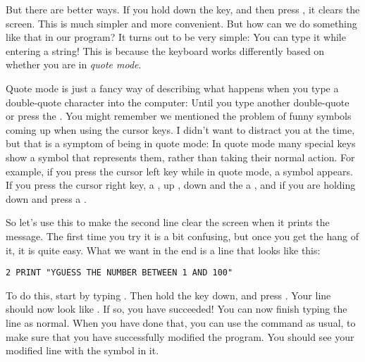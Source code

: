 But there are better ways.  If you hold down the 
key, and then press , it clears the
screen.  This is much simpler and more convenient. But how can we do
something like that in our program?  It turns out to be very simple:
You can type it while entering a string!  This is because the keyboard
works differently based on whether you are in {\em quote
  mode}.

Quote mode is just a fancy way of
describing what happens when you type a double-quote character into
the computer: Until you type another double-quote or press the
.  You might remember we mentioned the problem of
funny symbols coming up when using the cursor keys.  I didn't want to
distract you at the time, but that is a symptom of being in quote mode:
In quote mode many special keys show a symbol that represents them,
rather than taking their normal action.  For example, if you press the
cursor left key while in quote mode, a  symbol appears. If you
press the cursor right key, a , up , down  and the
 a , and if you are holding down
 and press  a .

\needspace{3cm}
So let's use this to make the second line clear the screen when it
prints the  message.  The
first time you try it is a bit confusing, but once you get the hang of
it, it is quite easy.  What we want in the end is a line that looks
like this:

\begin{tcolorbox}[colback=black,coltext=white]
\verbatimfont{\codefont}
\begin{verbatim}
2 PRINT "ƳGUESS THE NUMBER BETWEEN 1 AND 100"
\end{verbatim}
\end{tcolorbox}

To do this, start by typing .  Then hold the
 key down, and press .
Your line should now look like .  If so, you have
succeeded! You can now finish typing the line as normal.  When you
have done that, you can use the  command as usual, to make
sure that you have successfully modified the program.   You should
see your modified line with the  symbol in it.

